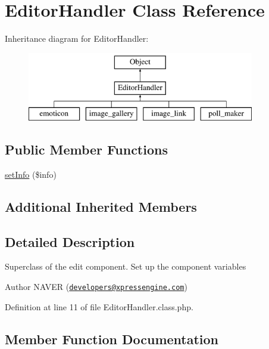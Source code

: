 \hypertarget{classEditorHandler}{}\section{Editor\+Handler Class Reference}
\label{classEditorHandler}
Inheritance diagram for Editor\+Handler\+:\begin{figure}[H]
\begin{center}
\leavevmode
\includegraphics[height=3.000000cm]{classEditorHandler}
\end{center}
\end{figure}
\subsection*{Public Member Functions}
\begin{DoxyCompactItemize}
\item 
\hyperlink{classEditorHandler_af44daebb94e0ce9ca6ff5a792fb52023}{set\+Info} (\$info)
\end{DoxyCompactItemize}
\subsection*{Additional Inherited Members}


\subsection{Detailed Description}
Superclass of the edit component. Set up the component variables

\begin{DoxyAuthor}{Author}
N\+A\+V\+ER (\href{mailto:developers@xpressengine.com}{\tt developers@xpressengine.\+com}) 
\end{DoxyAuthor}


Definition at line 11 of file Editor\+Handler.\+class.\+php.



\subsection{Member Function Documentation}
\mbox{\label{classEditorHandler_af44daebb94e0ce9ca6ff5a792fb52023}} 
